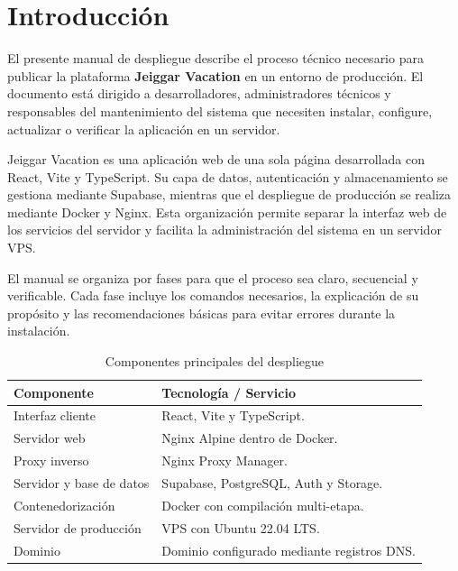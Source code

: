 \documentclass[12pt,letterpaper]{article}
\begin{document}
\newpage
\tableofcontents

\cleardoublepage
{}
{}
\listoftables

\cleardoublepage
{}
{}
\listoffigures

\section*{Introducción}

El presente manual de despliegue describe el proceso técnico necesario para publicar la plataforma \textbf{Jeiggar Vacation} en un entorno de producción. El documento está dirigido a desarrolladores, administradores técnicos y responsables del mantenimiento del sistema que necesiten instalar, configure, actualizar o verificar la aplicación en un servidor.

Jeiggar Vacation es una aplicación web de una sola página desarrollada con React, Vite y TypeScript. Su capa de datos, autenticación y almacenamiento se gestiona mediante Supabase, mientras que el despliegue de producción se realiza mediante Docker y Nginx. Esta organización permite separar la interfaz web de los servicios del servidor y facilita la administración del sistema en un servidor VPS.

El manual se organiza por fases para que el proceso sea claro, secuencial y verificable. Cada fase incluye los comandos necesarios, la explicación de su propósito y las recomendaciones básicas para evitar errores durante la instalación.

\begin{longtable}{|p{}|p{}|}
\caption{Componentes principales del despliegue}\\
\hline
\textbf{Componente} & \textbf{Tecnología / Servicio} \\
\hline
Interfaz cliente & React, Vite y TypeScript. \\
\hline
Servidor web & Nginx Alpine dentro de Docker. \\
\hline
Proxy inverso & Nginx Proxy Manager. \\
\hline
Servidor y base de datos & Supabase, PostgreSQL, Auth y Storage. \\
\hline
Contenedorización & Docker con compilación multi-etapa. \\
\hline
Servidor de producción & VPS con Ubuntu 22.04 LTS. \\
\hline
Dominio & Dominio configurado mediante registros DNS. \\
\hline
\end{longtable}
\end{document}
